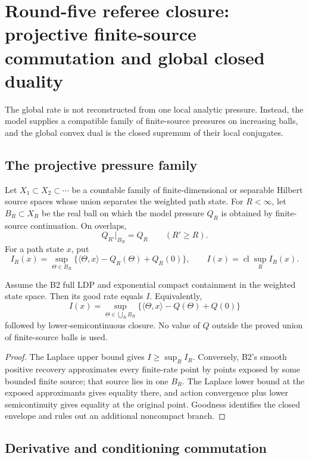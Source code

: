 \section{Round-five referee closure: projective finite-source commutation and global closed duality}
\label{sec:r5-d1}

The global rate is not reconstructed from one local analytic pressure.
Instead, the model supplies a compatible family of finite-source pressures
on increasing balls, and the global convex dual is the closed supremum of
their local conjugates.

\subsection{The projective pressure family}

Let \(X_1\subset X_2\subset\cdots\) be a countable family of finite-dimensional
or separable Hilbert source spaces whose union separates the weighted path
state.  For \(R<\infty\), let \(B_R\subset X_R\) be the real ball on which the
model pressure \(Q_R\) is obtained by finite-source continuation.  On
overlaps,
\[
 Q_{R'}|_{B_R}=Q_R\qquad(R'\ge R).
\]
For a path state \(x\), put
\[
 I_R(x)=\sup_{\Theta\in B_R}
 \{\langle\Theta,x\rangle-Q_R(\Theta)+Q_R(0)\},
 \qquad
 I(x)=\operatorname{cl}\sup_R I_R(x).
\]

\begin{theorem}
\label{thm:r5-d1-global}
Assume the B2 full LDP and exponential compact containment in the weighted
state space.  Then its good rate equals \(I\).  Equivalently,
\[
 I(x)=
 \sup_{\Theta\in\bigcup_RB_R}
 \{\langle\Theta,x\rangle-Q(\Theta)+Q(0)\}
\]
followed by lower-semicontinuous closure.  No value of \(Q\) outside the
proved union of finite-source balls is used.
\end{theorem}

\begin{proof}
The Laplace upper bound gives \(I\ge\sup_RI_R\).  Conversely, B2's smooth
positive recovery approximates every finite-rate point by points exposed by
some bounded finite source; that source lies in one \(B_R\).  The Laplace
lower bound at the exposed approximants gives equality there, and action
convergence plus lower semicontinuity gives equality at the original point.
Goodness identifies the closed envelope and rules out an additional
noncompact branch.
\end{proof}

\subsection{Derivative and conditioning commutation}

